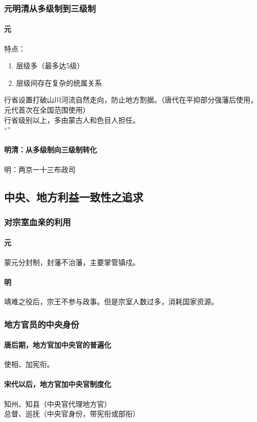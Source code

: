 \documentclass[twoside]{article}
\begin{document}
\subsubsection{元明清从多级制到三级制}
\paragraph*{元}
特点：
\begin{enumerate}
	\item 层级多（最多达5级）
	\item 层级间存在复杂的统属关系
\end{enumerate}
行省设置打破山川河流自然走向，防止地方割据。（唐代在平抑部分强藩后使用，元代首次在全国范围使用）\\
行省级别以上，多由蒙古人和色目人担任。\\
``''
\paragraph*{明清：从多级制向三级制转化}
明：两京一十三布政司
\subsection{中央、地方利益一致性之追求}
\subsubsection{对宗室血亲的利用}
\paragraph*{元}
蒙元分封制，封藩不治藩，主要掌管镇戍。
\paragraph*{明}
靖难之役后，宗王不参与政事。但是宗室人数过多，消耗国家资源。
\subsubsection{地方官员的中央身份}
\paragraph{唐后期，地方官加中央官的普遍化}使相、加宪衔。
\paragraph{宋代以后，地方官加中央官制度化}
知州、知县（中央官代理地方官）\\
总督、巡抚（中央官身份，带宪衔或部衔）
\end{document}
